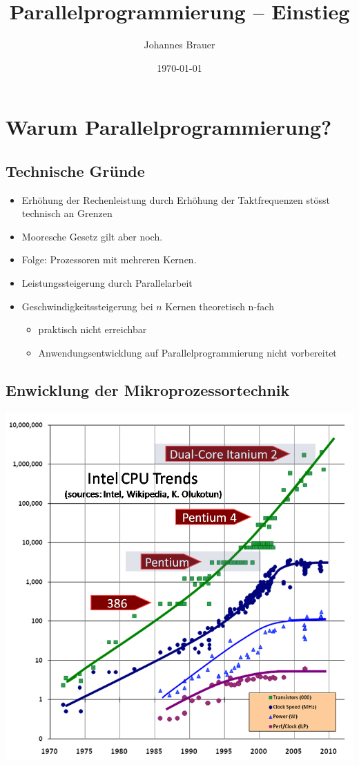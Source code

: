 \documentclass[11pt]{article}
\author{Johannes Brauer}
\date{\today}
\title{Parallelprogrammierung -- Einstieg}
\begin{document}
\maketitle

\section*{Warum Parallelprogrammierung?}
\label{sec:org8d1d276}

\subsection*{Technische Gründe}
\label{sec:org0d37114}
\begin{itemize}
\item Erhöhung der Rechenleistung durch Erhöhung der Taktfrequenzen stösst
technisch an Grenzen
\item Mooresche Gesetz gilt aber noch.
\item Folge: Prozessoren mit mehreren Kernen.
\item Leistungssteigerung durch Parallelarbeit
\item Geschwindigkeitssteigerung bei \(n\) Kernen theoretisch n-fach
\begin{itemize}
\item praktisch nicht erreichbar
\item Anwendungsentwicklung auf Parallelprogrammierung nicht vorbereitet
\end{itemize}
\end{itemize}
\subsection*{Enwicklung der Mikroprozessortechnik}
\label{sec:org0e0261f}
\begin{center}
\includegraphics[width=.9\linewidth]{./Abbildungen/CPU-Moore.png}
\end{center}
\end{document}
